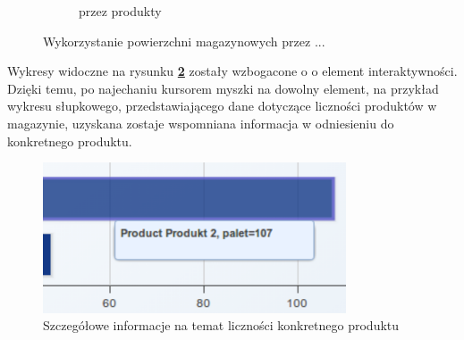 \begin{figure}[H]
\begin{subfigure}[b]{0.75\textwidth}
                \caption{przez produkty}
			\label{c7:fig:app:stat_product_bar}
       		\end{subfigure}
       		\caption[Aplikacja - Statystyki wykorzystania powierzchni]{Wykorzystanie powierzchni magazynowych przez ...}
			\label{c7:fig:app:stat_charts}
		\end{figure} 		
		Wykresy widoczne na rysunku \textbf{\ref{c7:fig:app:stat_charts}} zostały wzbogacone o
		o element interaktywności. Dzięki temu, po najechaniu kursorem myszki na dowolny element, na 
		przykład wykresu słupkowego, przedstawiającego dane dotyczące liczności produktów w magazynie, 
		uzyskana zostaje wspomniana informacja w odniesieniu do konkretnego produktu. 
		\begin{figure}[H]
			\centering
			\includegraphics[width=0.8\textwidth]{images/app/stat_bar_detail}
			\caption[Aplikacja - Szczegółowe informacje z wykresu]{Szczegółowe informacje na temat liczności konkretnego produktu}
			\label{c7:fig:app:stat_product_bar_detail}
		\end{figure}